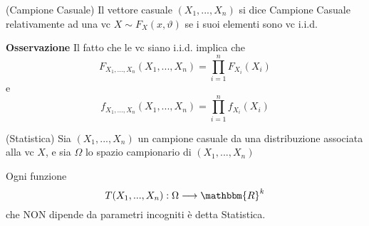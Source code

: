 \begin{definizione} (Campione Casuale)
Il vettore casuale $(X_1,...,X_n)$ si dice Campione Casuale relativamente ad una vc $X \sim F_X(x,\vartheta)$ se i suoi elementi sono vc i.i.d.
\end{definizione}

\noindent\textbf{Osservazione}
Il fatto che le vc siano i.i.d. implica che $$F_{X_1,...,X_n}(X_1,...,X_n)=\prod_{i=1}^n F_{X_i} (X_i)$$ e $$f_{X_1,...,X_n}(X_1,...,X_n)=\prod_{i=1}^n f_{X_i} (X_i)$$

\begin{definizione} (Statistica)
Sia $(X_1,...,X_n)$ un campione casuale da una distribuzione associata alla vc $X$, e sia $\Omega$ lo spazio campionario di $(X_1,...,X_n)$

\noindent Ogni funzione $$T(X_1,...,X_n):\Omega \longrightarrow \mathbbm{R}^k$$ che NON dipende da parametri incogniti è detta Statistica.
\end{definizione}







